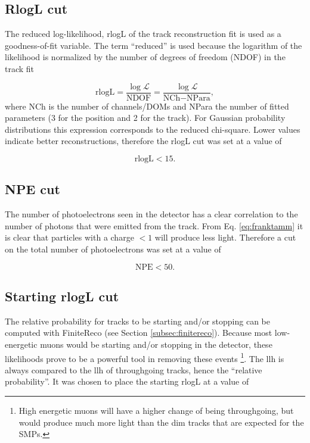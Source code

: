 \subsection{RlogL cut}
The reduced log-likelihood, rlogL of the track reconstruction fit is used as a goodness-of-fit variable. The term ``reduced'' is used because the logarithm of the likelihood is normalized by the number of degrees of freedom (NDOF) in the track fit

\begin{equation}
\textrm{rlogL} = \frac{\log \mathcal{L}}{\textrm{NDOF}} = \frac{\log \mathcal{L}}{\textrm{NCh} - \textrm{NPara}},
\end{equation}
where NCh is the number of channels/DOMs and NPara the number of fitted parameters (3 for the position and 2 for the track). For Gaussian probability distributions this expression corresponds to the reduced chi-square. Lower values indicate better reconstructions, therefore the rlogL cut was set at a value of 

\begin{equation}
\textrm{rlogL} < 15.
\end{equation}

\subsection{NPE cut}
The number of photoelectrons seen in the detector has a clear correlation to the number of photons that were emitted from the track. From Eq. \ref{eq:franktamm} it is clear that particles with a charge $< 1$ will produce less light. Therefore a cut on the total number of photoelectrons was set at a value of 

\begin{equation}
\textrm{NPE} < 50.
\end{equation} 


\subsection{Starting rlogL cut}
The relative probability for tracks to be starting and/or stopping can be computed with FiniteReco (see Section \ref{subsec:finitereco}). Because most low-energetic muons would be starting and/or stopping in the detector, these likelihoods prove to be a powerful tool in removing these events \footnote{High energetic muons will have a higher change of being throughgoing, but would produce much more light than the dim tracks that are expected for the SMPs.}. The llh is always compared to the llh of throughgoing tracks, hence the ``relative probability''. It was chosen to place the starting rlogL at a value of 

